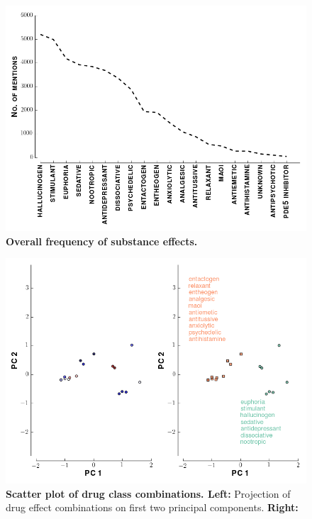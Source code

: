 \documentclass{article}
\begin{document}
\begin{figure}[h]
\centering
\includegraphics[scale=0.65]{effect-frequency.png}
\caption{\textbf{Overall frequency of substance effects.}}
\label{fig:effect-f}
\end{figure}

\begin{figure}[h]
\centering
\includegraphics[scale=0.65]{effect-matrix-pca-w-clusters-g.png}
\caption{\textbf{Scatter plot of drug class combinations. Left: }Projection of drug effect combinations on first two principal components. \textbf{Right:}}
\label{fig:pca}
\end{figure}



\end{document}
